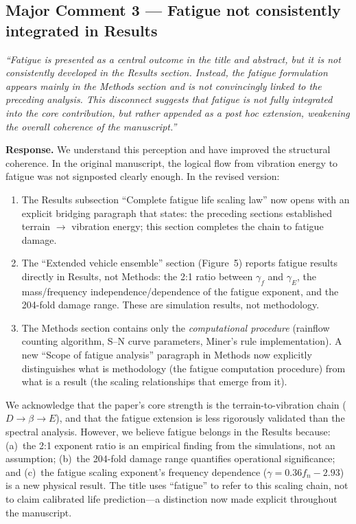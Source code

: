 \documentclass[11pt]{article}
\newcommand{\revquote}[1]{\medskip\noindent\textit{``#1''}\medskip}
\begin{document}
\bigskip

\subsection*{Major Comment 3 --- Fatigue not consistently integrated in Results}

\revquote{Fatigue is presented as a central outcome in the title and abstract, but it is not consistently developed in the Results section. Instead, the fatigue formulation appears mainly in the Methods section and is not convincingly linked to the preceding analysis. This disconnect suggests that fatigue is not fully integrated into the core contribution, but rather appended as a post hoc extension, weakening the overall coherence of the manuscript.}

\noindent\textbf{Response.} We understand this perception and have improved the structural coherence. In the original manuscript, the logical flow from vibration energy to fatigue was not signposted clearly enough. In the revised version:

\begin{enumerate}[leftmargin=*]
\item The Results subsection ``Complete fatigue life scaling law'' now opens with an explicit bridging paragraph that states: the preceding sections established terrain $\rightarrow$ vibration energy; this section completes the chain to fatigue damage.

\item The ``Extended vehicle ensemble'' section (Figure~5) reports fatigue results directly in Results, not Methods: the 2:1 ratio between $\gamma_f$ and $\gamma_E$, the mass/frequency independence/dependence of the fatigue exponent, and the 204-fold damage range. These are simulation results, not methodology.

\item The Methods section contains only the \emph{computational procedure} (rainflow counting algorithm, S--N curve parameters, Miner's rule implementation). A new ``Scope of fatigue analysis'' paragraph in Methods now explicitly distinguishes what is methodology (the fatigue computation procedure) from what is a result (the scaling relationships that emerge from it).
\end{enumerate}

\noindent We acknowledge that the paper's core strength is the terrain-to-vibration chain ($D \rightarrow \beta \rightarrow E$), and that the fatigue extension is less rigorously validated than the spectral analysis. However, we believe fatigue belongs in the Results because: (a)~the 2:1 exponent ratio is an empirical finding from the simulations, not an assumption; (b)~the 204-fold damage range quantifies operational significance; and (c)~the fatigue scaling exponent's frequency dependence ($\gamma = 0.36f_n - 2.93$) is a new physical result. The title uses ``fatigue'' to refer to this scaling chain, not to claim calibrated life prediction---a distinction now made explicit throughout the manuscript.
\end{document}
